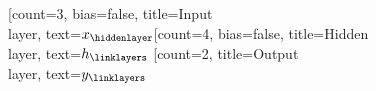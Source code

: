 \begin{neuralnetwork}[height=1]
    \newcommand{\nodetextclear}[2]{}
    \newcommand{\nodetexth}[2]{$h_#2$}
    \newcommand{\nodetextx}[2]{$x_#2$}
    \newcommand{\nodetexty}[2]{$y_#2$}
    [count=3, bias=false, title=Input\\layer, text=\nodetextx]
    \hiddenlayer[count=4, bias=false, title=Hidden\\layer, text=\nodetexth] \linklayers
    \outputlayer[count=2, title=Output\\layer, text=\nodetexty] \linklayers
\end{neuralnetwork}